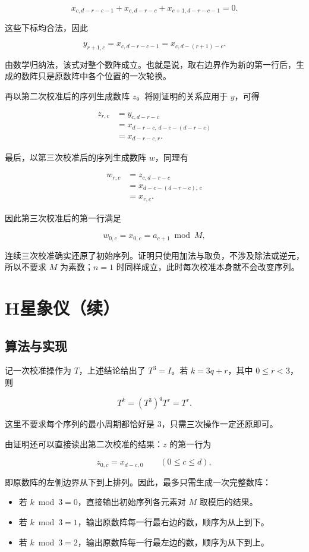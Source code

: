 \documentclass[UTF8,a4paper,11pt,fontset=none]{ctexart}
\newcommand{\topic}[1]{\Needspace{5\baselineskip}\subsection*{#1}}
\begin{document}
\[
x_{c,d-r-c-1}+x_{c,d-r-c}+x_{c+1,d-r-c-1}=0.
\]

这些下标均合法，因此

\[
y_{r+1,c}=x_{c,d-r-c-1}
=x_{c,d-(r+1)-c}.
\]

由数学归纳法，该式对整个数阵成立。也就是说，取右边界作为新的第一行后，生成的数阵只是原数阵中各个位置的一次轮换。

再以第二次校准后的序列生成数阵 $z$。将刚证明的关系应用于 $y$，可得

\[
\begin{aligned}
z_{r,c}
&=y_{c,d-r-c}\\
&=x_{d-r-c,\,d-c-(d-r-c)}\\
&=x_{d-r-c,r}.
\end{aligned}
\]

最后，以第三次校准后的序列生成数阵 $w$，同理有

\[
\begin{aligned}
w_{r,c}
&=z_{c,d-r-c}\\
&=x_{d-c-(d-r-c),\,c}\\
&=x_{r,c}.
\end{aligned}
\]

因此第三次校准后的第一行满足

\[
w_{0,c}=x_{0,c}=a_{c+1}\bmod M,
\]

连续三次校准确实还原了初始序列。证明只使用加法与取负，不涉及除法或逆元，所以不要求 $M$ 为素数；$n=1$ 时同样成立，此时每次校准本身就不会改变序列。

\clearpage\section*{H\quad 星象仪（续）}
\topic{算法与实现}
记一次校准操作为 $T$，上述结论给出了 $T^3=I$。若 $k=3q+r$，其中 $0\le r<3$，则

\[
T^k=(T^3)^qT^r=T^r.
\]

这里不要求每个序列的最小周期都恰好是 $3$，只需三次操作一定还原即可。

由证明还可以直接读出第二次校准的结果：$z$ 的第一行为

\[
z_{0,c}=x_{d-c,0}\qquad(0\le c\le d),
\]

即原数阵的左侧边界从下到上排列。因此，最多只需生成一次完整数阵：

\begin{itemize}
\item 若 $k\bmod 3=0$，直接输出初始序列各元素对 $M$ 取模后的结果。
\item 若 $k\bmod 3=1$，输出原数阵每一行最右边的数，顺序为从上到下。
\item 若 $k\bmod 3=2$，输出原数阵每一行最左边的数，顺序为从下到上。
\end{itemize}
\end{document}
